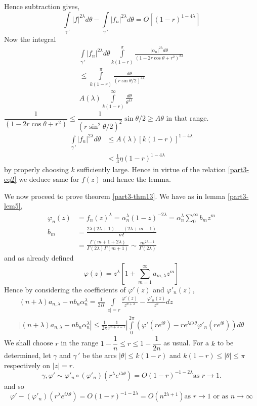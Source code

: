 Hence subtraction gives,
\begin{equation*}
\int\limits_{\gamma\,'}|f|^{2\lambda}d\theta
-\int\limits_{\gamma\,'}|f_{n}|^{2\lambda}d\theta
=O[(1-r)^{1-4\lambda}]\tag{3.2.3}\label{part3-eq3.2.3} 
\end{equation*}
Now the integral
\begin{gather*}
\int\limits_{\gamma \,'}|f_{n}|^{2\lambda}d\theta
\int\limits^{\pi}_{k(1-r)}\frac{|\alpha_{n}|^{2\lambda}d\theta}{(1-2r\cos
  \theta+r^{2})^{2 \lambda}}\\
\leq \int\limits^{\pi}_{k(1-r)}\frac{d\theta}{(r\sin
  \theta/2)^{4\lambda}}\\
A(\lambda)\int\limits^{\infty}_{k(1-r)}\frac{d\theta}{\theta^{4\lambda}}
\end{gather*}
$\dfrac{1}{(1-2r\cos\theta+r^{2})}\leq
\dfrac{1}{(r\sin^{2}\theta/2)^{2}}\sin\theta/2\geq A\theta$ in that
range.
\begin{align*}
\int\limits_{\gamma \,'}|f_{n}|^{2\lambda}d\theta & \leq
A(\lambda)[k(1-r)]^{1-4\lambda}\tag{4}\label{part3-eq4}\\ 
&< \frac{1}{3}\eta (1-r)^{1-4\lambda}
\end{align*}\pageoriginale
by properly choosing $k$ sufficiently large. Hence in virtue of the
relation \eqref{part3-eq2} we deduce same for $f(z)$ and hence the
lemma. 

We now proceed to prove theorem \ref{part3-thm13}. We have as in lemma
\ref{part3-lem5}, 
\begin{align*}
\varphi_{n}(z) &=
f_{n}(z)^{\lambda}=\alpha^{\lambda}_{n}(1-z)^{-2\lambda}=\alpha^{\lambda}_{n}\sum^{\infty}_{0}b_{m}z^{m}\\
b_{m} &= \frac{2\lambda(2\lambda+1)\ldots\ldots (2\lambda+m-1)}{m!}\\
&= \frac{\Gamma(m+1+2\lambda)}{\Gamma(2\lambda)\Gamma(m+1)}\sim
\frac{m^{2\lambda-1}}{\Gamma(2\lambda)} 
\end{align*}
and as already defined
$$
\varphi(z)=z^{\lambda}\left[1+\sum^{\infty}_{m=1}a_{m,\lambda}z^{m}\right]
$$
Hence by considering the coefficients of $\varphi'(z)$ and
$\varphi'_{n}(z)$,
\begin{gather*}
(n+\lambda)a_{n,\lambda}-nb_{n}\alpha^{\lambda}_{n}=\frac{1}{2\Pi}\int\limits_{|z|=r}\frac{\varphi'(z)}{z^{n+\lambda}}-\frac{\varphi'_{n}(z)}{z^{n}}dz\\
\Big| (n+\lambda)a_{n,\lambda}-nb_{n}\alpha^{\lambda}_{n}\left|\leq
\frac{1}{2\pi}\frac{1}{r^{n+\lambda-1}}\right| \int\limits^{2\pi}_{0}
\left(\varphi'(re^{i\theta})-re^{\lambda
  i\lambda\theta}\varphi'_{n}(re^{i\theta})\right)d\theta 
\end{gather*}
We shall choose $r$ in the range $1-\dfrac{1}{n}\leq r\leq
1-\dfrac{1}{2n}$ as usual. For a $k$ to be determined, let $\gamma$
and $\gamma\,'$ be the arcs $|\theta|\leq k(1-r)$ and $k(1-r)\leq
|\theta|\leq \pi$ respectively on $|z|=r$.
$$
\gamma,\varphi'\sim \varphi'_{n}\circ
(\varphi'_{n})(r^{\lambda}e^{i\lambda\theta})= O(1-r)^{-1-2\lambda}\text{
  \ as \ } r\to 1.
$$\pageoriginale
and so
$$
\varphi'-(\varphi'_{n})(r^{\lambda}e^{i\lambda\theta})=O(1-r)^{-1-2\lambda}
=O(n^{2\lambda+1})\text{
  \ as \ } r\to 1 \text{ \ or as \ } n\to \infty
$$

